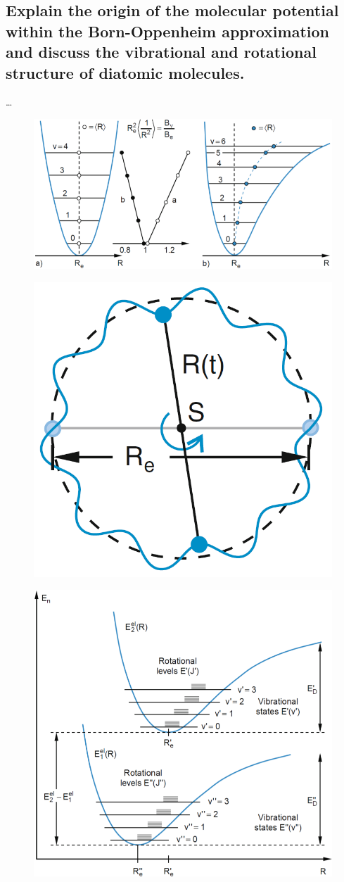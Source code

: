 \subsection{Explain the origin of the molecular potential within the Born-Oppenheim approximation and discuss the vibrational and rotational structure of diatomic molecules.}


\ldots

\begin{figure}[!h]
    \centering
    \includegraphics[width=.8\textwidth]{Q20/images/AfstandMellemEnerginiveauerneIToForskelligePotentialleApproksimationer.PNG}
    \caption{}
    \label{fig:Q20_AfstandMellemEnerginiveauer}
\end{figure}

\begin{figure}[!h]
    \centering
    \includegraphics[width=.35\textwidth]{Q20/images/VibratingRotor.PNG}
    \caption{}
    \label{fig:Q20_VibratingRotor}
\end{figure}

\begin{figure}[!h]
    \centering
    \includegraphics[width=.8\textwidth]{Q20/images/VibrationOgRotationIPotentialDiatomartMolekyle.PNG}
    \caption{}
    \label{fig:Q20_VibrationOgRotationPotential}
\end{figure}